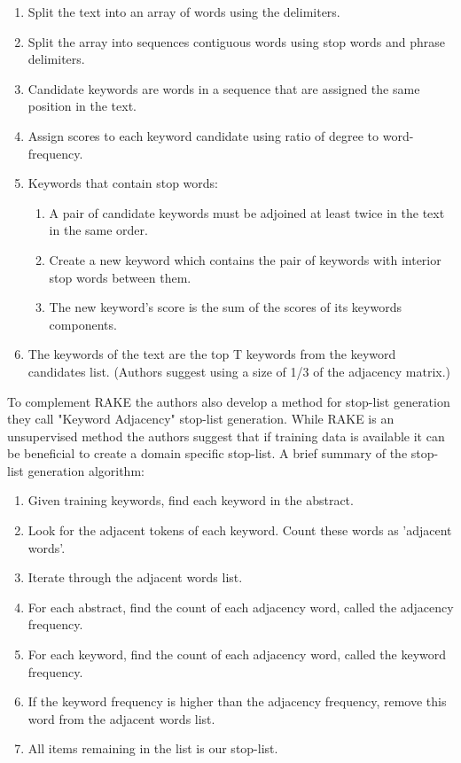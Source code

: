 \documentclass[11pt,a4paper]{article}
\begin{document}
\begin{enumerate}
	\small \itemsep0em 

	\item Split the text into an array of words using the delimiters.
	\item Split the array into sequences contiguous words using stop words and phrase delimiters.
	\item Candidate keywords are words in a sequence that are assigned the same position in the text. 
	\item Assign scores to each keyword candidate using ratio of degree to word-frequency. 
	\item Keywords that contain stop words:
	\begin{enumerate}
		\item A pair of candidate keywords must be adjoined at least twice in the text in the same order.
		\item Create a new keyword which contains the pair of keywords with interior stop words between them.
		\item The new keyword’s score is the sum of the scores of its keywords components.
	\end{enumerate}
	\item The keywords of the text are the top T keywords from the keyword candidates list. (Authors suggest using a size of 1/3 of the adjacency matrix.)

	\normalsize
\end{enumerate}

To complement RAKE the authors also develop a method for stop-list generation they call "Keyword Adjacency" stop-list generation. While RAKE is an unsupervised method the authors suggest that if training data is available it can be beneficial to create a domain specific stop-list.  A brief summary of the stop-list generation algorithm:

\begin{enumerate}
	\small \itemsep0em 

	\item Given training keywords, find each keyword in the abstract.
	\item Look for the adjacent tokens of each keyword. Count these words as 'adjacent words'.
	\item Iterate through the adjacent words list.
	\item For each abstract, find the count of each adjacency word, called the adjacency frequency.
	\item For each keyword, find the count of each adjacency word, called the keyword frequency.
	\item If the keyword frequency is higher than the adjacency frequency, remove this word from the adjacent words list.
	\item All items remaining in the list is our stop-list. 

	\normalsize
\end{enumerate}
\end{document}
